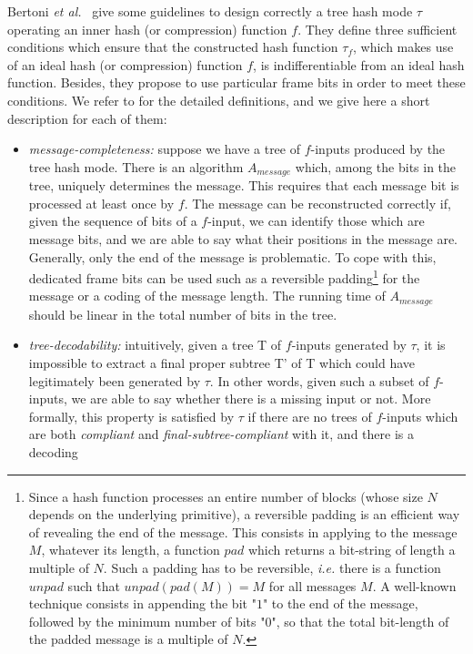 \documentclass{llncs}
\begin{document}
Bertoni \textit{et al.}~\cite{BDPV09,BDPV14_Suf}
give some guidelines to design correctly a tree hash mode $\tau$ operating an inner hash (or compression) function $f$. 
They define three sufficient conditions which ensure that the constructed hash function $\tau_f$, which makes use of 
an ideal hash (or compression) function $f$,
is indifferentiable from an ideal hash function. Besides, they propose to use particular frame bits in order to meet these conditions.
We refer to \cite{BDPV09,BDPV14_Suf} for the detailed definitions, and we give here a short description for each of them:
\begin{itemize}
 \item \textit{message-completeness:} 
 suppose we have a tree of $f$-inputs produced by the tree hash mode. There is an algorithm $A_{message}$ which, among the bits in the tree, 
 uniquely determines the message. 
 This requires that each message bit is processed at least once by $f$. The message can be reconstructed correctly if, given the sequence of bits of a $f$-input, 
 we can identify those which are message bits, and we are able to say what their positions in the message are. 
Generally, only the end of the message is problematic. To cope with this, dedicated frame bits can be used such as a reversible 
 padding\footnote{Since a hash function processes an entire number of blocks (whose size $N$ depends on the underlying primitive), 
 a reversible padding is an efficient way of revealing the end of the message. This consists in applying to the message $M$, whatever its length, 
 a function $pad$ which returns a bit-string of length a multiple of $N$.
 Such a padding has to be reversible, \emph{i.e.} there is a function $unpad$ such that $unpad(pad(M))=M$ for all messages $M$.
 A well-known technique consists in appending the bit "$1$" to the end of the message, followed by the minimum number of bits "$0$", so that the total bit-length of the 
 padded message is a multiple of $N$.} for the message or a coding of the message length.
 The running time of $A_{message}$ should be linear in the total number of bits in the tree.
\item \emph{tree-decodability:} 
intuitively, given a tree T of $f$-inputs generated by $\tau$, it is impossible to extract a final proper subtree T' of T 
which could have legitimately been generated by $\tau$. 
In other words, given such a subset of $f$-inputs, we are able to say whether there is a missing input or not. More formally,
 this property is satisfied by $\tau$ if there are no trees of $f$-inputs which are both \emph{compliant} and \emph{final-subtree-compliant} with it, and there is a decoding

\end{itemize}
\end{document}
